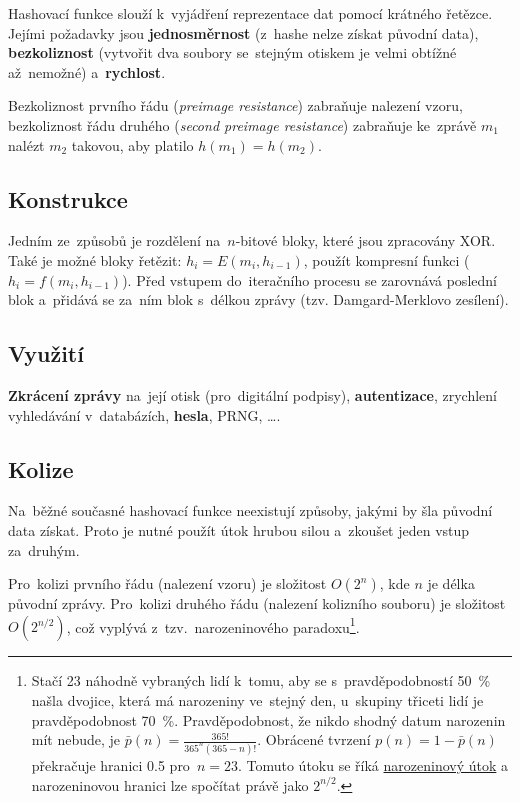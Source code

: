 Hashovací funkce slouží k~vyjádření reprezentace dat pomocí krátného řetězce. Jejími požadavky jsou \textbf{jednosměrnost} (z~hashe nelze získat původní data), \textbf{bezkoliznost} (vytvořit dva soubory se~stejným otiskem je velmi obtížné až~nemožné) a~\textbf{rychlost}.

Bezkoliznost prvního řádu (\emph{preimage resistance}) zabraňuje nalezení vzoru, bezkoliznost řádu druhého (\emph{second preimage resistance}) zabraňuje ke~zprávě $m_1$ nalézt $m_2$ takovou, aby platilo $h(m_1) = h(m_2)$.

\subsection{Konstrukce}

Jedním ze~způsobů je rozdělení na~$n$-bitové bloky, které jsou zpracovány XOR. Také je možné bloky řetězit: $h_i = E(m_i, h_{i-1})$, použít kompresní funkci ($h_i = f(m_i, h_{i-1})$). Před vstupem do~iteračního procesu se zarovnává poslední blok a~přidává se za~ním blok s~délkou zprávy (tzv. Damgard-Merklovo zesílení).

\subsection{Využití}

\textbf{Zkrácení zprávy} na~její otisk (pro~digitální podpisy), \textbf{autentizace}, zrychlení vyhledávání v~databázích, \textbf{hesla}, PRNG, \dots.


\subsection{Kolize}

Na~běžné současné hashovací funkce neexistují způsoby, jakými by šla původní data získat. Proto je nutné použít útok hrubou silou a~zkoušet jeden vstup za~druhým. %

Pro~kolizi prvního řádu (nalezení vzoru) je složitost $O(2^n)$, kde $n$ je délka původní zprávy. Pro~kolizi druhého řádu (nalezení kolizního souboru) je složitost $O(2^{n/2})$, což vyplývá z~tzv.~narozeninového paradoxu\footnote{
Stačí 23 náhodně vybraných lidí k~tomu, aby se s~pravděpodobností 50~\% našla dvojice, která má narozeniny ve~stejný den, u~skupiny třiceti lidí je pravděpodobnost 70~\%. Pravděpodobnost, že nikdo shodný datum narozenin mít nebude, je $\bar{p}(n) = \frac{365!}{365^n(365 - n)!}$. Obrácené tvrzení $p(n) = 1 - \bar{p}(n)$ překračuje hranici 0.5 pro~$n=23$.
Tomuto útoku se říká \href{https://en.wikipedia.org/wiki/Birthday_attack}{narozeninový útok} a narozeninovou hranici lze spočítat právě jako $2^{n/2}$.
}.

